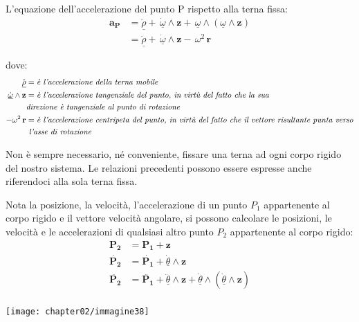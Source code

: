 		L'equazione dell'accelerazione del punto P rispetto alla terna fissa:
			\begin{equation*}
			\begin{split}
					\mathbf{a_P} &= \ddot{\underline{\rho}} + \, \dot{\underline{\omega}} \wedge \mathbf{z} + \, \underline{\omega} \wedge (\underline{\omega}\wedge \mathbf{z})\\
					&= \ddot{\underline{\rho}} + \, \dot{\underline{\omega}} \wedge \mathbf{z} - \, \omega^2 \, \mathbf{r}
			\end{split}	
			\end{equation*}
		
			dove: 
			\begin{align*}
				 \ddot{\underline{\rho}}  &=  \emph{è l'accelerazione della terna mobile}\\
				  \dot{\underline{\omega}} \wedge \mathbf{z} &= \emph{è l'accelerazione tangenziale del punto, in virtù del fatto che la sua}\\
				  & \emph{direzione è tangenziale al punto di rotazione}\\
				  - \omega^2 \, \mathbf{r} &= \emph{è l'accelerazione centripeta del punto, in virtù del fatto che il vettore risultante punta verso}\\
				  & \emph{ l'asse di rotazione}
			\end{align*}
		
		
		Non è sempre necessario, né conveniente, fissare una terna ad ogni corpo rigido del nostro sistema. Le relazioni precedenti possono essere espresse anche riferendoci alla sola terna fissa.		
		
		\begin{minipage}{.5\textwidth}
		Nota la posizione, la velocità, l'accelerazione di un punto $P_1$ appartenente al corpo rigido e il vettore velocità angolare, si possono calcolare le posizioni, le velocità e le accelerazioni di qualsiasi altro punto $P_2$ appartenente al corpo rigido:
				\begin{align*}
					\mathbf{P_2} &= \mathbf{P_1} + \mathbf{z}\\
					\dot{\mathbf{P_2}} &= \dot{\mathbf{P_1}}  + \dot{\underline{\theta}} \wedge \mathbf{z}\\
					\ddot{\mathbf{P_2}} &= \ddot{\mathbf{P_1}}  +  \ddot{\underline{\theta}} \wedge \mathbf{z} + \dot{\underline{\theta}} \wedge (\dot{\underline{\theta}} \wedge \mathbf{z})\\
				\end{align*}	
		\end{minipage}
		\hfill
		\begin{minipage}{.5\textwidth}
			\centering
			\texttt{[image: chapter02/immagine38]}
		\end{minipage}
		
